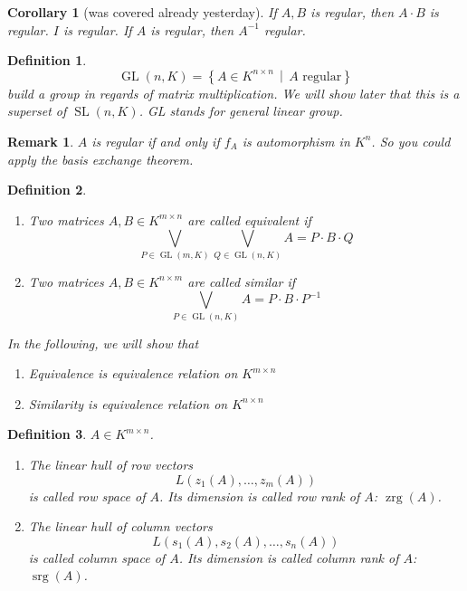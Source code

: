 \documentclass[a4paper,landscape,twocolumn]{article}
\newcommand\setdef[2]{\left\{#1\,\middle|\,#2\right\}}
\newtheorem{defi}{Definition}[section]
\newtheorem{rem}{Remark}[section]
\newtheorem{cor}{Corollary}[section]
\begin{document}
%
\begin{cor}[was covered already yesterday]
  If $A, B$ is regular, then $A \cdot B$ is regular. $I$ is regular.
  If $A$ is regular, then $A^{-1}$ regular.
\end{cor}
%
\begin{defi}
  \label{def-6.16}
  \[ \operatorname{GL}(n, K) = \setdef{A \in K^{n \times n}}{A \text{ regular}} \]
  build a group in regards of matrix multiplication.
  We will show later that this is a superset of $\operatorname{SL}(n, K)$.
  GL stands for \emph{general linear group}.
\end{defi}
%
\begin{rem}
  $A$ is regular if and only if $f_A$ is automorphism in $K^n$.
  So you could apply the basis exchange theorem.
\end{rem}
%
\begin{defi}
  \label{def-6.17}
  \begin{enumerate}
    \item Two matrices $A, B \in K^{m\times n}$ are called equivalent if
      \[ \bigvee_{P \in \operatorname{GL}(m, K)} \bigvee_{Q \in \operatorname{GL}(n, K)} A = P \cdot B \cdot Q \]
    \item Two matrices $A, B \in K^{n\times m}$ are called \emph{similar} if
      \[ \bigvee_{P \in \operatorname{GL}(n, K)} A = P \cdot B \cdot P^{-1} \]
  \end{enumerate}

  In the following, we will show that
  \begin{enumerate}
    \item Equivalence is equivalence relation on $K^{m \times n}$
    \item Similarity is equivalence relation on $K^{n \times n}$
  \end{enumerate}
\end{defi}
%
\begin{defi}
  $A \in K^{m \times n}$.
  \begin{enumerate}
    \item The linear hull of row vectors
      \[ L(z_1(A), \ldots, z_m(A)) \]
      is called \emph{row space} of $A$.
      Its dimension is called \emph{row rank} of $A$: $\operatorname{zrg}(A)$.
    \item The linear hull of column vectors
      \[ L(s_1(A), s_2(A), \ldots, s_n(A)) \]
      is called \emph{column space} of $A$.
      Its dimension is called \emph{column rank} of $A$: $\operatorname{srg}(A)$.
  \end{enumerate}
\end{defi}
\end{document}
